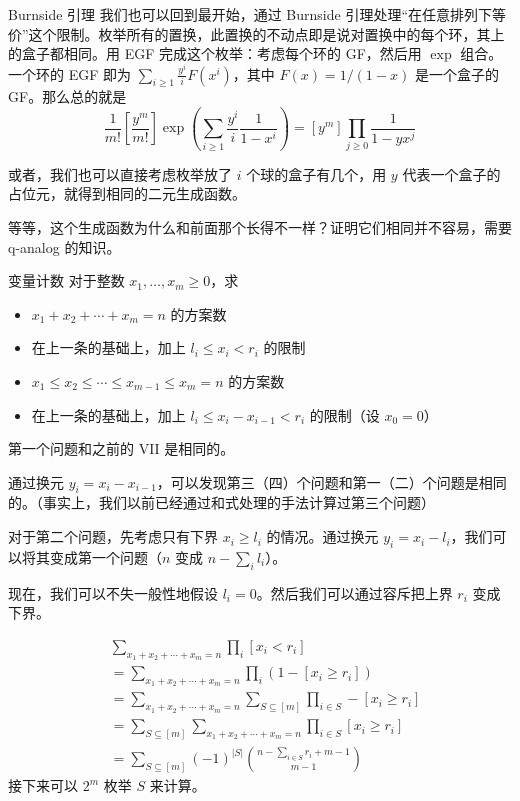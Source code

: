 \begin{frame}{Burnside 引理}
    我们也可以回到最开始，通过 Burnside 引理处理“在任意排列下等价”这个限制。枚举所有的置换，此置换的不动点即是说对置换中的每个环，其上的盒子都相同。用 EGF 完成这个枚举：考虑每个环的 GF，然后用 $\exp$ 组合。一个环的 EGF 即为 $\sum_{i\ge 1}\frac{y^i}{i}F(x^i)$，其中 $F(x)=1/(1-x)$ 是一个盒子的 GF。那么总的就是
    $$
    \frac{1}{m!}\left[\frac{y^m}{m!}\right]\exp\left(\sum_{i\ge 1}\frac{y^i}{i}\frac{1}{1-x^i}\right)=[y^m]\prod_{j\ge 0}\frac{1}{1-yx^j}
    $$

    或者，我们也可以直接考虑枚举放了 $i$ 个球的盒子有几个，用 $y$ 代表一个盒子的占位元，就得到相同的二元生成函数。

    等等，这个生成函数为什么和前面那个长得不一样？证明它们相同并不容易，需要 q-analog 的知识。
\end{frame}
\begin{frame}{变量计数}
    对于整数 $x_1,\ldots,x_m\ge 0$，求

    \begin{itemize}
        \item $x_1+x_2+\cdots+x_m=n$ 的方案数
        \item 在上一条的基础上，加上 $l_i\le x_i< r_i$ 的限制
        \item $x_1\le x_2\le\cdots\le x_{m-1}\le x_m=n$ 的方案数
        \item 在上一条的基础上，加上 $l_i\le x_i-x_{i-1}< r_i$ 的限制（设 $x_0=0$）
    \end{itemize}
\end{frame}
\begin{frame}
    第一个问题和之前的 VII 是相同的。

    通过换元 $y_i=x_i-x_{i-1}$，可以发现第三（四）个问题和第一（二）个问题是相同的。（事实上，我们以前已经通过和式处理的手法计算过第三个问题）

    对于第二个问题，先考虑只有下界 $x_i\ge l_i$ 的情况。通过换元 $y_i=x_i-l_i$，我们可以将其变成第一个问题（$n$ 变成 $n-\sum_i l_i$）。

    现在，我们可以不失一般性地假设 $l_i=0$。然后我们可以通过容斥把上界 $r_i$ 变成下界。
\end{frame}
\begin{frame}
    $$
    \begin{aligned}
    &\sum_{x_1+x_2+\cdots+x_m=n}\prod_i [x_i<r_i]\\
    &=\sum_{x_1+x_2+\cdots+x_m=n}\prod_i(1-[x_i\ge r_i])\\
    &=\sum_{x_1+x_2+\cdots+x_m=n}\sum_{S\subseteq [m]}\prod_{i\in S}-[x_i\ge r_i]\\
    &=\sum_{S\subseteq [m]}\sum_{x_1+x_2+\cdots+x_m=n}\prod_{i\in S}[x_i\ge r_i]\\
    &=\sum_{S\subseteq [m]}(-1)^{|S|}\binom{n-\sum_{i\in S}r_i+m-1}{m-1}
    \end{aligned}
    $$
    接下来可以 $2^m$ 枚举 $S$ 来计算。
\end{frame}

